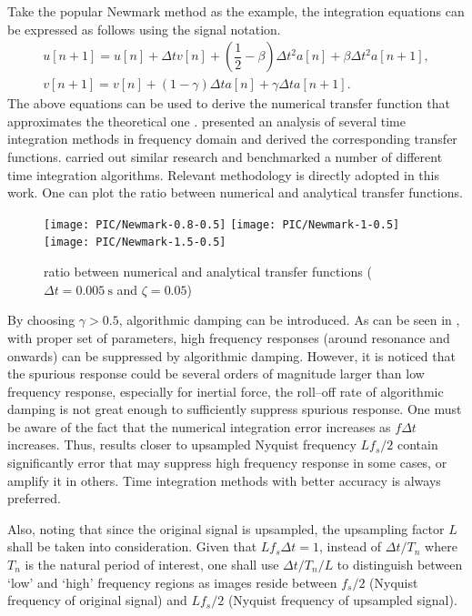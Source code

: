 Take the popular Newmark method as the example, the integration equations can be expressed as follows using the signal notation.
\begin{gather}
u[n+1]=u[n]+\Delta{}tv[n]+\left(\dfrac{1}{2}-\beta\right)\Delta{}t^2a[n]+\beta\Delta{}t^2a[n+1],\\
v[n+1]=v[n]+\left(1-\gamma\right)\Delta{}ta[n]+\gamma\Delta{}ta[n+1].
\end{gather}
The above equations can be used to derive the numerical transfer function that approximates the theoretical one . \citet{Preumont1982} presented an analysis of several time integration methods in frequency domain and derived the corresponding transfer functions. \citet{AriasTrujillo2012} carried out similar research and benchmarked a number of different time integration algorithms. Relevant methodology is directly adopted in this work. One can plot the ratio between numerical and analytical transfer functions.
\begin{figure}[htb!]
\centering
\texttt{[image: PIC/Newmark-0.8-0.5]}
\texttt{[image: PIC/Newmark-1-0.5]}
\texttt{[image: PIC/Newmark-1.5-0.5]}
\caption{ratio between numerical and analytical transfer functions ($\Delta{}t=\SI{0.005}{\second}$ and $\zeta=0.05$)}\label{fig:newmark_alg_damping}
\end{figure}
By choosing $\gamma>\num{0.5}$, algorithmic damping can be introduced. As can be seen in , with proper set of parameters, high frequency responses (around resonance and onwards) can be suppressed by algorithmic damping. However, it is noticed that the spurious response could be several orders of magnitude larger than low frequency response, especially for inertial force, the roll--off rate of algorithmic damping is not great enough to sufficiently suppress spurious response. One must be aware of the fact that the numerical integration error increases as $f\Delta{}t$ increases. Thus, results closer to upsampled Nyquist frequency $Lf_s/2$ contain significantly error that may suppress high frequency response in some cases, or amplify it in others. Time integration methods with better accuracy is always preferred.

Also, noting that since the original signal is upsampled, the upsampling factor $L$ shall be taken into consideration. Given that $Lf_s\Delta{}t=1$, instead of $\Delta{}t/T_n$ where $T_n$ is the natural period of interest, one shall use $\Delta{}t/T_n/L$ to distinguish between `low' and `high' frequency regions as images reside between $f_s/2$ (Nyquist frequency of original signal) and $Lf_s/2$ (Nyquist frequency of upsampled signal).

